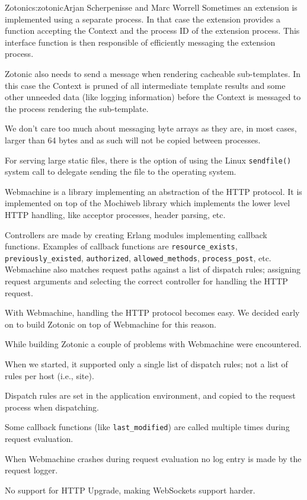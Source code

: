 \begin{aosachapter}{Zotonic}{s:zotonic}{Arjan Scherpenisse and Marc Worrell}
Sometimes an extension is implemented using a separate process. In that
case the extension provides a function accepting the Context and the
process ID of the extension process. This interface function is then
responsible of efficiently messaging the extension process.

Zotonic also needs to send a message when rendering cacheable
sub-templates. In this case the Context is pruned of all intermediate
template results and some other unneeded data (like logging information)
before the Context is messaged to the process rendering the
sub-template.

We don't care too much about messaging byte arrays as they are, in most
cases, larger than 64 bytes and as such will not be copied between
processes.

For serving large static files, there is the option of using the Linux
\texttt{sendfile()} system call to delegate sending the file to the
operating system.


Webmachine is a library implementing an abstraction of the HTTP
protocol. It is implemented on top of the Mochiweb library which
implements the lower level HTTP handling, like acceptor processes,
header parsing, etc.

Controllers are made by creating Erlang modules implementing callback
functions. Examples of callback functions are \texttt{resource\_exists},
\texttt{previously\_existed}, \texttt{authorized},
\texttt{allowed\_methods}, \texttt{process\_post}, etc. Webmachine also
matches request paths against a list of dispatch rules; assigning
request arguments and selecting the correct controller for handling the
HTTP request.

With Webmachine, handling the HTTP protocol becomes easy. We decided
early on to build Zotonic on top of Webmachine for this reason.

While building Zotonic a couple of problems with Webmachine were
encountered.

\begin{aosaenumerate}
\def\labelenumi{\arabic{enumi}.}

\item
  When we started, it supported only a single list of dispatch rules;
  not a list of rules per host (i.e., site).
\item
  Dispatch rules are set in the application environment, and copied to
  the request process when dispatching.
\item
  Some callback functions (like \texttt{last\_modified}) are called
  multiple times during request evaluation.
\item
  When Webmachine crashes during request evaluation no log entry is made
  by the request logger.
\item
  No support for HTTP Upgrade, making WebSockets support harder.
\end{aosaenumerate}


\end{aosachapter}
